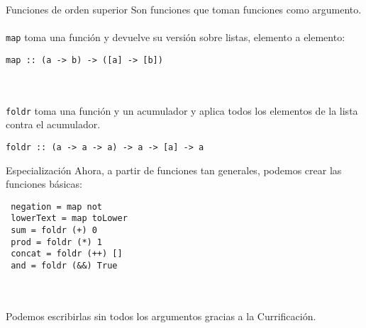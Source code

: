 \begin{frame}[fragile]{Funciones de orden superior}
  Son funciones que toman funciones como argumento.
  \\~\\
  \texttt{map} toma una función y devuelve su versión sobre listas,
  elemento a elemento:
  \begin{lstlisting}
map :: (a -> b) -> ([a] -> [b])
  \end{lstlisting}
  \\~\\
  \texttt{foldr} toma una función y un acumulador y aplica todos los elementos
  de la lista contra el acumulador.
  \begin{lstlisting}
foldr :: (a -> a -> a) -> a -> [a] -> a
  \end{lstlisting}
\end{frame}

\begin{frame}[fragile]{Especialización}
  Ahora, a partir de funciones tan generales, podemos crear las funciones básicas:
  \begin{lstlisting}
 negation = map not
 lowerText = map toLower
 sum = foldr (+) 0
 prod = foldr (*) 1
 concat = foldr (++) []
 and = foldr (&&) True
  \end{lstlisting}
  \\~\\
  Podemos escribirlas sin todos los argumentos gracias a la Currificación.
\end{frame}

